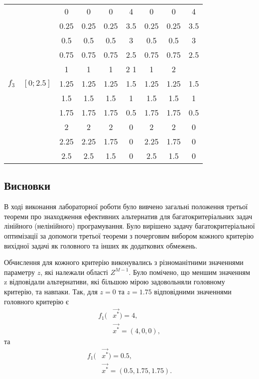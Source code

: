 \begin{table}[H]
\begin{tabular}{c|c|c|c c c|c c c}
            \multirow{11}{*}{$f_3$} & \multirow{11}{*}{$[0;2.5]$} &
            0  & 0 &  0  & 4 &  0 &  0 &  4 \\
            & & 0.25 &   0.25 &   0.25  &  3.5& 0.25  &  0.25 &   3.5 \\
            & & 0.5 &0.5& 0.5& 3 &  0.5& 0.5 &3 \\
            & & 0.75 &   0.75  &  0.75 &   2.5& 0.75  &  0.75&    2.5\\
            & & 1  & 1  & 1 &  2   1  & 1 &  2 \\
            & & 1.25  &  1.25 &   1.25  &  1.5 &1.25  &  1.25  &  1.5 \\
            & & 1.5& 1.5& 1.5& 1 &  1.5& 1.5 &1 \\
            & & 1.75 &   1.75 &   1.75 &   0.5 &1.75 &   1.75  &  0.5 \\
            & & 2 &  2  & 2  & 0  & 2 &  2  & 0 \\
            & & 2.25  &  2.25 &   1.75 &   0  & 2.25 &   1.75 &   0 \\
            & & 2.5 &2.5& 1.5& 0  & 2.5 &1.5& 0

        \end{tabular}
        \end{table}

\subsection{Висновки}
В ході виконання лабораторної роботи було вивчено загальні положення третьої теореми про знаходження ефективних альтернатив для багатокритеріальних задач лінійного (нелінійного) програмування. 
Було вирішено задачу багатокритеріальної оптимізації за допомоги третьої теореми з почерговим вибором кожного критерію вихідної задачі як головного та інших як додаткових обмежень.

Обчислення для кожного критерію виконувались з різноманітними значеннями параметру $z$, які належали області $Z^{M-1}$. 
Було помічено, що меншим значенням z відповідали альтернативи, які більшою мірою задовольняли головному критерію, та навпаки. 
Так, для $z = 0$ та $z = 1.75$ відповідними значеннями головного критерію є
\begin{align*}
f_1(&\vec{x^*})=4, \\
&\vec{x^*}=(4, 0, 0),
\end{align*}
та 
\begin{align*}
f_1(&\vec{x^*})=0.5, \\
&\vec{x^*}=(0.5, 1.75, 1.75).
\end{align*}



